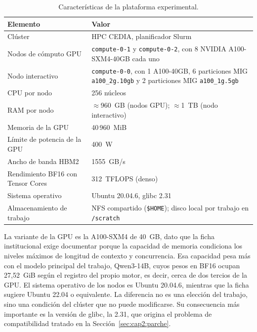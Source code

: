 \begin{table}[htbp]
  \centering
  \caption{Características de la plataforma experimental.}
  \label{tab:cap2:plataforma}
  \small
  \begin{tabular}{|p{}|p{}|}
    \hline
    \textbf{Elemento} & \textbf{Valor} \\
    \hline
    Clúster & HPC CEDIA, planificador Slurm \\
    \hline
    Nodos de cómputo GPU & \texttt{compute-0-1} y \texttt{compute-0-2}, con 8 NVIDIA A100-SXM4-40GB cada uno \\
    \hline
    Nodo interactivo & \texttt{compute-0-0}, con 1 A100-40GB, 6 particiones MIG \texttt{a100\_2g.10gb} y 2 particiones MIG \texttt{a100\_1g.5gb} \\
    \hline
    CPU por nodo & 256 núcleos \\
    \hline
    RAM por nodo & $\approx$960~GB (nodos GPU); $\approx$1~TB (nodo interactivo) \\
    \hline
    Memoria de la GPU & 40\,960~MiB \\
    \hline
    Límite de potencia de la GPU & 400~W \\
    \hline
    Ancho de banda HBM2 & 1555~GB/s \\
    \hline
    Rendimiento BF16 con Tensor Cores & 312~TFLOPS (denso) \\
    \hline
    Sistema operativo & Ubuntu 20.04.6, glibc 2.31 \\
    \hline
    Almacenamiento de trabajo & NFS compartido (\texttt{\$HOME}); disco local por trabajo en \texttt{/scratch} \\
    \hline
  \end{tabular}
\end{table}

La variante de la GPU es la A100-SXM4 de 40~GB, dato que la ficha institucional exige documentar porque la capacidad de memoria condiciona los niveles máximos de longitud de contexto y concurrencia. Esa capacidad pesa más con el modelo principal del trabajo, Qwen3-14B, cuyos pesos en BF16 ocupan 27,52~GiB según el registro del propio motor, es decir, cerca de dos tercios de la GPU. El sistema operativo de los nodos es Ubuntu 20.04.6, mientras que la ficha sugiere Ubuntu 22.04 o equivalente. La diferencia no es una elección del trabajo, sino una condición del clúster que no puede modificarse. Su consecuencia más importante es la versión de glibc, la 2.31, que origina el problema de compatibilidad tratado en la Sección~\ref{sec:cap2:parche}.

